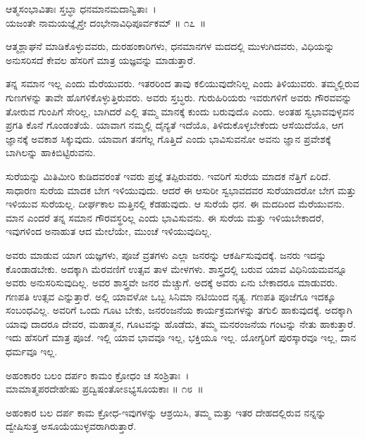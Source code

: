 \begin{shloka}
ಆತ್ಮಸಂಭಾವಿತಾಃ ಸ್ತಬ್ಧಾ ಧನಮಾನಮದಾನ್ವಿತಾಃ~।\\ಯಜಂತೇ ನಾಮಯಜ್ಞೈಸ್ತೇ ದಂಭೇನಾವಿಧಿಪೂರ್ವಕಮ್ \hfill॥ ೧೭~॥
\end{shloka}

\begin{artha}
ಆತ್ಮಶ್ಲಾಘನೆ ಮಾಡಿಕೊಳ್ಳುವವರು, ದುರಹಂಕಾರಿಗಳು, ಧನಮಾನಗಳ ಮದದಲ್ಲಿ ಮುಳುಗಿದವರು, ವಿಧಿಯನ್ನು ಅನುಸರಿಸದೆ ಕೇವಲ ಹೆಸರಿಗೆ ಮಾತ್ರ ಯಜ್ಞವನ್ನು ಮಾಡುತ್ತಾರೆ.
\end{artha}

ತನ್ನ ಸಮಾನ ಇಲ್ಲ ಎಂದು ಮೆರೆಯುವರು. ಇತರರಿಂದ ತಾವು ಕಲಿಯುವುದೇನಿಲ್ಲ ಎಂದು ತಿಳಿಯುವರು. ತಮ್ಮಲ್ಲಿರುವ ಗುಣಗಳನ್ನು ತಾವೇ ಹೊಗಳಿಕೊಳ್ಳುತ್ತಿರುವರು. ಅವರು ಸ್ತಬ್ಧರು. ಗುರುಹಿರಿಯರು ಇವರುಗಳಿಗೆ ಅವರು ಗೌರವವನ್ನು ತೋರುವ ಗುಂಪಿಗೆ ಸೇರಿಲ್ಲ, ಬಾಗಿದರೆ ಎಲ್ಲಿ ತಮ್ಮ ಮಾನಕ್ಕೆ ಕುಂದು ಬರುವುದೊ ಎಂದು. ಅಂತಹ ಸ್ವಭಾವವುಳ್ಳವನ ಪ್ರಗತಿ ಕೊನೆ ಗೊಂಡಂತೆಯೆ. ಯಾವಾಗ ನಮ್ಮಲ್ಲಿ ದೈನ್ಯತೆ ಇದೆಯೊ, ತಿಳಿದುಕೊಳ್ಳಬೇಕೆಂದು ಆಸೆಯಿದೆಯೊ, ಆಗ ಜ್ಞಾನಕ್ಕೆ ಅವಕಾಶ ಸಿಕ್ಕುವುದು. ಯಾವಾಗ ತನಗೆಲ್ಲ ಗೊತ್ತಿದೆ ಎಂದು ಭಾವಿಸುವನೋ ಅವನು ಜ್ಞಾನ ಪ್ರವೇಶಕ್ಕೆ ಬಾಗಿಲನ್ನು ಹಾಕಿಬಿಟ್ಟಿರುವನು.

ಸುರೆಯನ್ನು ಮಿತಿಮೀರಿ ಕುಡಿದವರಂತೆ ಇವರು ಪ್ರಜ್ಞೆ ತಪ್ಪಿರುವರು. ಇವರಿಗೆ ಸುರೆಯ ಮಾದಕ ನೆತ್ತಿಗೆ ಏರಿದೆ. ಸಾಧಾರಣ ಸುರೆಯ ಮಾದಕ ಬೇಗ ಇಳಿಯುವುದು. ಆದರೆ ಈ ಆಸುರೀ ಸ್ವಭಾವದವರ ಸುರೆಯಾದರೋ ಬೇಗ ಮತ್ತು ಇಳಿಯುವ ಸುರೆಯಲ್ಲ. ದೀರ್ಘಕಾಲ ಮತ್ತಿನಲ್ಲಿ ಕೆಡಹುವುದು. ಆ ಸುರೆಯೆ ಧನ. ಈ ಮದದಿಂದ ಮೆರೆಯುವನು. ಮಾನ ಎಂದರೆ ತನ್ನ ಸಮಾನ ಗೌರವಸ್ಥರಿಲ್ಲ ಎಂದು ಭಾವಿಸುವನು. ಈ ಸುರೆಯ ಮತ್ತು ಇಳಿಯಬೇಕಾದರೆ, ಇವುಗಳಿಂದ ಅನಾಹುತ ಆದ ಮೇಲೆಯೇ, ಮುಂಚೆ ಇಳಿಯುವುದಿಲ್ಲ.

ಅವರು ಮಾಡುವ ಯಾಗ ಯಜ್ಞಗಳು, ಪೂಜೆ ವ್ರತಗಳು ಎಲ್ಲಾ ಜನರನ್ನು ಆಕರ್ಷಿಸುವುದಕ್ಕೆ. ಜನರು ಇದನ್ನು ಕೊಂಡಾಡಬೇಕು. ಅದಕ್ಕಾಗಿ ಮೆರವಣಿಗೆ ಉತ್ಸವ ತಾಳ ಮೇಳಗಳು. ಶಾಸ್ತ್ರದಲ್ಲಿ ಬರುವ ಯಾವ ವಿಧಿನಿಯಮವನ್ನೂ ಅವರು ಅನುಸರಿಸುವುದಿಲ್ಲ. ಅವರ ಶಾಸ್ತ್ರವೇ ಜನರ ಮೆಚ್ಚುಗೆ. ಅದಕ್ಕೆ ಅವರು ಏನು ಬೇಕಾದರೂ ಮಾಡುವರು. ಗಣಪತಿ ಉತ್ಸವ ಎನ್ನುತ್ತಾರೆ. ಅಲ್ಲಿ ಯಾವಳೋ ಒಬ್ಬ ಸಿನಿಮಾ ನಟಿಯಿಂದ ನೃತ್ಯ. ಗಣಪತಿ ಪೂಜೆಗೂ ಇದಕ್ಕೂ ಸಂಬಂಧವಿಲ್ಲ. ಅವರಿಗೆ ಒಂದು ಗೂಟ ಬೇಕು, ಜನರಂಜನೆಯ ಕಾರ್ಯಕ್ರಮಗಳನ್ನು ತಗುಲಿ ಹಾಕುವುದಕ್ಕೆ. ಅದಕ್ಕಾಗಿ ಯಾವು ದಾದರೂ ದೇವರ, ಮಹಾತ್ಮನ, ಗೂಟವನ್ನು ಹೊಡೆದು, ತಮ್ಮ ಮನರಂಜನೆಯ ಗಂಟನ್ನು ನೇತು ಹಾಕುತ್ತಾರೆ. ಇದು ಹೆಸರಿಗೆ ಮಾತ್ರ ಪೂಜೆ. ಇಲ್ಲಿ ಯಾವ ಭಾವವೂ ಇಲ್ಲ, ಭಕ್ತಿಯೂ ಇಲ್ಲ. ಯೋಗ್ಯರಿಗೆ ಪುರಸ್ಕಾರವೂ ಇಲ್ಲ, ದಾನ ಧರ್ಮವೂ ಇಲ್ಲ.

\begin{shloka}
ಅಹಂಕಾರಂ ಬಲಂ ದರ್ಪಂ ಕಾಮಂ ಕ್ರೋಧಂ ಚ ಸಂಶ್ರಿತಾಃ~।\\ಮಾಮಾತ್ಮಪರದೇಹೇಷು ಪ್ರದ್ವಿಷಂತೋಽಭ್ಯಸೂಯಕಾಃ \hfill॥ ೧೮~॥
\end{shloka}

\begin{artha}
ಅಹಂಕಾರ ಬಲ ದರ್ಪ ಕಾಮ ಕ್ರೋಧ-ಇವುಗಳನ್ನು ಆಶ್ರಯಿಸಿ, ತಮ್ಮ ಮತ್ತು ಇತರ ದೇಹದಲ್ಲಿರುವ ನನ್ನನ್ನು ದ್ವೇಷಿಸುತ್ತ ಅಸೂಯೆಯುಳ್ಳವರಾಗಿರುತ್ತಾರೆ.
\end{artha}

